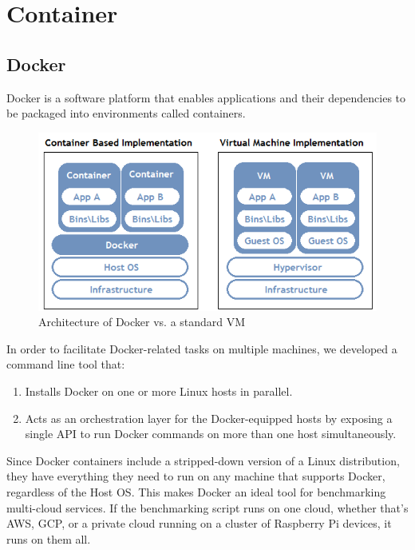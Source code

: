 \section{Container}

\subsection{Docker}

Docker is a software platform that enables applications and their dependencies to be packaged into  environments called containers.

\begin{figure}[htb]
  \includegraphics[width=\linewidth]{images/docker.png}
  \caption{Architecture of Docker vs. a standard VM}
\end{figure}

In order to facilitate Docker-related tasks on multiple machines, we developed a command line tool that:

\begin{enumerate}
    \item Installs Docker on one or more Linux hosts in parallel.
    \item Acts as an orchestration layer for the Docker-equipped hosts by exposing a single API to run Docker commands on more than one host simultaneously.
\end{enumerate}

Since Docker containers include a stripped-down version of a Linux distribution, they have everything they need to run on any machine that supports Docker, regardless of the Host OS. This makes Docker an ideal tool for benchmarking multi-cloud services. If the benchmarking script runs on one cloud, whether that's AWS, GCP, or a private cloud running on a cluster of Raspberry Pi devices, it runs on them all.

